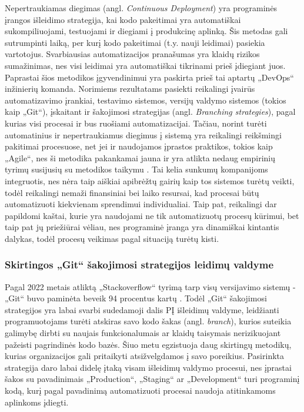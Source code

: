 \documentclass{VUMIFPSkursinis}
\begin{document}
Nepertraukiamas diegimas (angl. \textit{Continuous Deployment}) yra programinės įrangos išleidimo strategija, kai kodo pakeitimai yra automatiškai sukompiliuojami, testuojami ir diegiami į produkcinę aplinką. Šis metodas gali sutrumpinti laiką, per kurį kodo pakeitimai (t.y. nauji leidimai) pasiekia vartotojus. Svarbiausias automatizacijos pranašumas yra klaidų rizikos sumažinimas, nes visi leidimai yra automatiškai tikrinami prieš įdiegiant juos. Paprastai šios metodikos įgyvendinimui yra paskirta prieš tai aptartų „DevOps“ inžinierių komanda. Norimiems rezultatams pasiekti reikalingi įvairūs automatizavimo įrankiai, testavimo sistemos, versijų valdymo sistemos (tokios kaip „Git“), įskaitant ir šakojimosi strategijas (angl. \textit{Branching strategies}), pagal kurias visi procesai ir bus ruošiami automatizacijai. Tačiau, norint turėti automatinius ir nepertraukiamus diegimus į sistemą yra reikalingi reikšmingi pakitimai procesuose, net jei ir naudojamos įprastos praktikos, tokios kaip „Agile“, nes ši metodika pakankamai jauna ir yra atlikta nedaug empirinių tyrimų susijusių su metodikos taikymu \cite{SaltSeptintas}. Tai kelia sunkumų kompanijoms integruotis, nes nėra taip aiškiai apibrėžtų gairių kaip tos sistemos turėtų veikti, todėl reikalingi nemaži finansiniai bei laiko resursai, kad procesai būtų automatizuoti kiekvienam sprendimui individualiai. Taip pat, reikalingi dar papildomi kaštai, kurie yra naudojami ne tik automatizuotų procesų kūrimui, bet taip pat jų priežiūrai vėliau, nes programinė įranga yra dinamiškai kintantis dalykas, todėl procesų veikimas pagal situaciją turėtų kisti.
    
    \subsubsection{Skirtingos „Git“ šakojimosi strategijos leidimų valdyme}

Pagal 2022 metais atliktą „Stackoverflow“ tyrimą tarp visų versijavimo sistemų - „Git“ buvo paminėta beveik 94 procentus kartų \cite{SaltAstuntas}. Todėl „Git“ šakojimosi strategijos yra labai svarbi sudedamoji dalis PĮ išleidimų valdyme, leidžianti programuotojams turėti atskiras savo kodo šakas (angl. \textit{branch}), kurios suteikia galimybę dirbti su naujais funkcionalumais ar klaidų taisymais nerizikuojant pažeisti pagrindinės kodo bazės. Šiuo metu egzistuoja daug skirtingų metodikų, kurias organizacijos gali pritaikyti atsižvelgdamos į savo poreikius. Pasirinkta strategija daro labai didelę įtaką visam išleidimų valdymo procesui, nes įprastai šakos su pavadinimais „Production“, „Staging“ ar „Development“ turi programinį kodą, kurį pagal pavadinimą automatizuoti procesai naudoja atitinkamoms aplinkoms įdiegti.
\end{document}
